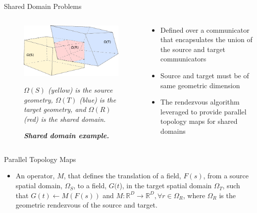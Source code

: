 \documentclass{beamer}
\begin{document}
\begin{frame}{Shared Domain Problems}

  \begin{columns}
    
    \begin{column}{0.5\textwidth}
      \begin{figure}[htpb!]
        \centering \includegraphics[width=2.5in]{overlapping_domain.pdf}
        \caption{\bf \sl Shared domain example.} {\sl $\Omega(S)$ (yellow)
          is the source geometry, $\Omega(T)$ (blue) is the target geometry,
          and $\Omega(R)$ (red) is the shared domain.}
        \label{fig:shared_domain}
      \end{figure}
    \end{column}

    \begin{column}{0.5\textwidth}
      \begin{itemize}
      \item Defined over a communicator that encapsulates the union of
        the source and target communicators
        \medskip
      \item Source and target must be of same geometric dimension
        \medskip
      \item The rendezvous algorithm leveraged to provide parallel
        topology maps for shared domains
      \end{itemize}
    \end{column}

  \end{columns}

\end{frame}

\begin{frame}{Parallel Topology Maps}

  \begin{itemize}
  \item An operator, $M$, that defines the translation of a field,
    $F(s)$, from a source spatial domain, $\Omega_S$, to a field,
    $G(t$), in the target spatial domain $\Omega_T$, such that
    $G(t)\leftarrow M(F(s))$ and $M: \mathbb{R}^D \rightarrow
    \mathbb{R}^D, \forall r \in \Omega_R$, where $\Omega_R$ is the
    geometric rendezvous of the source and target.
  \end{itemize}

\end{frame}
\end{document}
